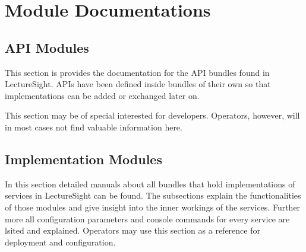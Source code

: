 \documentclass[a4paper,10pt]{book}
\begin{document}
\chapter{Module Documentations}

\section{API Modules}

This section is provides the documentation for the API bundles found in LectureSight. APIs have been defined inside bundles of their own so that implementations can be added or exchanged later on.

This section may be of special interested for developers. Operators, however, will in most cases not find valuable information here. 

\section{Implementation Modules}

In this section detailed manuals about all bundles that hold implementations of services in LectureSight can be found. The subsections explain the functionalities of those modules  and give insight into the inner workings of the services. Further more all configuration parameters and console commands for every service are lsited and explained. Operators may use this section as a reference for deployment and configuration.


\backmatter
%
%
 
 
\end{document}
